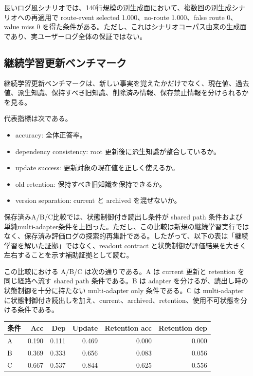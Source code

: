 \documentclass[12pt,a4paper]{article}
\begin{document}
長いログ風シナリオでは、140行規模の別生成面において、複数回の別生成シナリオへの再適用で route-event selected 1.000、no-route 1.000、false route 0、value miss 0 を得た条件がある。ただし、これはシナリオコーパス由来の生成面であり、実ユーザーログ全体の保証ではない。

\subsection{継続学習更新ベンチマーク}\label{ux7d99ux7d9aux5b66ux7fd2ux66f4ux65b0ux30d9ux30f3ux30c1ux30deux30fcux30af}

継続学習更新ベンチマークは、新しい事実を覚えたかだけでなく、現在値、過去値、派生知識、保持すべき旧知識、削除済み情報、保存禁止情報を分けられるかを見る。

代表指標は次である。

\begin{itemize}
\tightlist
\item
  accuracy: 全体正答率。
\item
  dependency consistency: root 更新後に派生知識が整合しているか。
\item
  update success: 更新対象の現在値を正しく使えるか。
\item
  old retention: 保持すべき旧知識を保持できるか。
\item
  version separation: current と archived を混ぜないか。
\end{itemize}

保存済みA/B/C比較では、状態制御付き読出し条件が shared path 条件および単純multi-adapter条件を上回った。ただし、この比較は新規の継続学習実行ではなく、保存済み評価ログの探索的再集計である。したがって、以下の表は「継続学習を解いた証拠」ではなく、readout contract と状態制御が評価結果を大きく左右することを示す補助証拠として読む。

この比較における A/B/C は次の通りである。A は current 更新と retention を同じ経路へ流す shared path 条件である。B は adapter を分けるが、読出し時の状態制御を十分に持たない multi-adapter only 条件である。C は multi-adapter に状態制御付き読出しを加え、current、archived、retention、使用不可状態を分ける条件である。

{\def\LTcaptype{table} %
\begin{longtable}[]{@{}lrrrrr@{}}
\toprule\noalign{}
条件 & Acc & Dep & Update & Retention acc & Retention dep \\
\midrule\noalign{}
\endhead
\bottomrule\noalign{}
\endlastfoot
A & 0.190 & 0.111 & 0.469 & 0.000 & 0.000 \\
B & 0.369 & 0.333 & 0.656 & 0.083 & 0.056 \\
C & 0.667 & 0.537 & 0.844 & 0.625 & 0.556 \\
\end{longtable}
}
\end{document}
